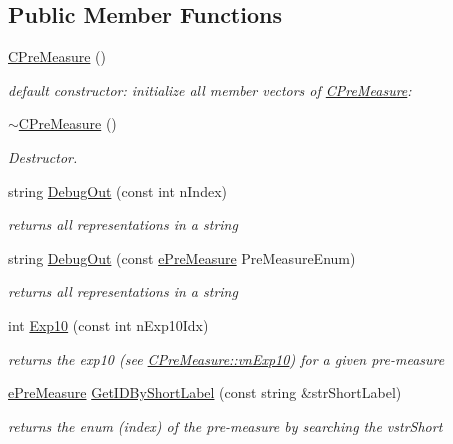 \subsection*{Public Member Functions}
\begin{DoxyCompactItemize}
\item 
\hyperlink{classCPreMeasure_acf40211e2818677f65b85f2db360c001}{C\+Pre\+Measure} ()
\begin{DoxyCompactList}\small\item\em default constructor\+: initialize all member vectors of \hyperlink{classCPreMeasure}{C\+Pre\+Measure}\+: \end{DoxyCompactList}\item 
\hyperlink{classCPreMeasure_ab927f07495fc7757c1488010f4440bc0}{$\sim$\+C\+Pre\+Measure} ()
\begin{DoxyCompactList}\small\item\em Destructor. \end{DoxyCompactList}\item 
string \hyperlink{classCPreMeasure_aa097540f3c74a3c616dee8ed1e120489}{Debug\+Out} (const int n\+Index)
\begin{DoxyCompactList}\small\item\em returns all representations in a string \end{DoxyCompactList}\item 
string \hyperlink{classCPreMeasure_a15f09957565ea1a5b4ca5975c1bbd76a}{Debug\+Out} (const \hyperlink{PreMeasure_8h_a6c81167b8d4c2badde42f81cb7214620}{e\+Pre\+Measure} Pre\+Measure\+Enum)
\begin{DoxyCompactList}\small\item\em returns all representations in a string \end{DoxyCompactList}\item 
int \hyperlink{classCPreMeasure_a1f6c35d76304a9eeb8105a53df63df0f}{Exp10} (const int n\+Exp10\+Idx)
\begin{DoxyCompactList}\small\item\em returns the exp10 (see \hyperlink{classCPreMeasure_a2c50eadae55427f0d77a013b3fab0fdb}{C\+Pre\+Measure\+::vn\+Exp10}) for a given pre-\/measure \end{DoxyCompactList}\item 
\hyperlink{PreMeasure_8h_a6c81167b8d4c2badde42f81cb7214620}{e\+Pre\+Measure} \hyperlink{classCPreMeasure_a6d9ee00647db5c9cb13e229c375096f8}{Get\+I\+D\+By\+Short\+Label} (const string \&str\+Short\+Label)
\begin{DoxyCompactList}\small\item\em returns the enum (index) of the pre-\/measure by searching the vstr\+Short \end{DoxyCompactList}\item 

\end{DoxyCompactItemize}
